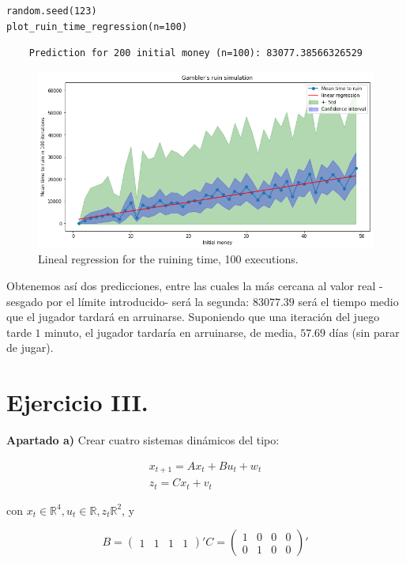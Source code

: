 \documentclass[a4paper]{article}
\newcommand{\R}{\mathbb{R}}
\begin{document}
\begin{verbatim}
random.seed(123)
plot_ruin_time_regression(n=100)
\end{verbatim}

\begin{verbatim}
	Prediction for 200 initial money (n=100): 83077.38566326529
\end{verbatim}

\begin{figure}[H]
	\includegraphics[scale=.6]{figures/gambler3_1}
	\centering
	\caption{Lineal regression for the ruining time, 100 executions.}
\end{figure}

Obtenemos así dos predicciones, entre las cuales la más cercana al valor real -sesgado por el límite introducido- será la segunda: $83077.39$ será el tiempo medio que el jugador tardará en arruinarse. Suponiendo que una iteración del juego tarde $1$ minuto, el jugador tardaría en arruinarse, de media, $57.69$ días (sin parar de jugar).

\section*{Ejercicio III.}

\textbf{Apartado a)} Crear cuatro sistemas dinámicos del tipo:

\begin{gather*}
	x_{t+1} = A x_t + B u_t + w_t \\
	z_t = C x_t + v_t
\end{gather*}

con $x_t \in \R^4, u_t \in \R, z_t \R^2$, y

\[
	B = \begin{pmatrix} 1 & 1 & 1 & 1 \end{pmatrix}'
	C = \begin{pmatrix}
		1 & 0 & 0 & 0 \\
		0 & 1 & 0 & 0
	\end{pmatrix}'
\]
\end{document}
